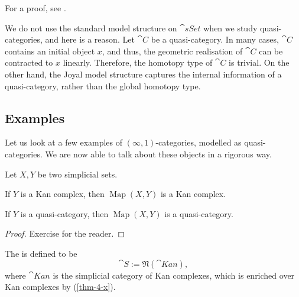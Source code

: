 For a proof, see \cite[Theorem~2.2.5.1]{htt}.

\begin{remark}
    We do not use the standard model structure on $\cat{sSet}$
    when we study quasi-categories, and here is a reason.
    Let $\cat C$ be a quasi-category.
    In many cases, $\cat C$ contains an initial object $x$,
    and thus, the geometric realisation of $\cat C$ 
    can be contracted to $x$ linearly.
    Therefore, the homotopy type of $\cat C$ is trivial.
    On the other hand, the Joyal model structure 
    captures the internal information of a quasi-category,
    rather than the global homotopy type. \varqed
\end{remark}

\subsection{Examples}

Let us look at a few examples of $(\infty,1)$-categories,
modelled as quasi-categories.
We are now able to talk about these objects in a rigorous way.

\begin{proposition}\label{thm-4-x}
    Let $X,Y$ be two simplicial sets.
    \begin{itms}
        \item If $Y$ is a Kan complex,
        then $\operatorname{Map}(X,Y)$ is a Kan complex.
        \item If $Y$ is a quasi-category,
        then $\operatorname{Map}(X,Y)$ is a quasi-category.
    \end{itms}
\end{proposition}

\begin{proof}
    Exercise for the reader.
\end{proof}

\begin{example}
    The  is defined to be
    \[\cat S:=\mathfrak N(\cat{Kan}),\]
    where $\cat{Kan}$ is the simplicial category of Kan complexes,
    which is enriched over Kan complexes by (\ref{thm-4-x}).
    \varqed
\end{example}

